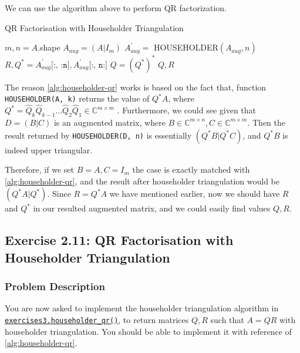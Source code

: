 \noindent We can use the algorithm above to perform QR factorization.
\begin{algorithm}[H]
  \caption{QR Factorisation with Householder Triangulation}
  \label{alg:householder-qr}
  \begin{algorithmic}[1]
  \State $m, n = A$.shape
  \State \(A_{aug} = (A|I_m)\)  
  \State \(A_{aug}^{'} = \) HOUSEHOLDER\((A_{aug}, n)\)  
  \State \(R, Q^{*} = A_{aug}^{'}\texttt{[:, :n]}, A_{aug}^{'}\texttt{[:, n:]}\)  
  \State \(Q = (Q^{*})^{*}\)  
    \State \Return \(Q, R\) 
  \EndProcedure
  \end{algorithmic}
\end{algorithm}
\noindent The reason \autoref{alg:householder-qr} works is based on the fact that, function \texttt{HOUSEHOLDER(A, k)} returns the value of \(Q^{*}A\), where \(Q^{*} = \hat{Q}_{k}\hat{Q}_{k - 1}\dots \hat{Q}_{2}\hat{Q}_{1} \in \mathbb{C}^{m\times m}\)  . Furthermore, we could see given that \(D = (B | C)\) is an augmented matrix, where \(B \in \mathbb{C}^{m\times n}, C \in \mathbb{C}^{m\times m}\). Then the result returned by \texttt{HOUSEHOLDER(D, n)} is essentially \((Q^{*}B | Q^{*}C)\), and \(Q^{*}B\) is indeed upper triangular.  \medskip

\noindent Therefore, if we set \(B = A, C = I_{m}\) the case is exactly matched with \autoref{alg:householder-qr}, and the result after householder triangulation would be \((Q^{*}A|Q^{*})\). Since \(R = Q^{*}A\) we have mentioned earlier, now we should have \(R\)  and \(Q^{*}\) in our resulted augmented matrix, and we could easily find values \(Q, R\).

\subsection*{Exercise 2.11: QR Factorisation with Householder Triangulation}
\subsubsection*{Problem Description}%
You are now asked to implement the householder triangulation algorithm in \href{https://comp-lin-alg.github.io/cla_utils.html#cla_utils.exercises3.householder_qr}{\texttt{exercises3.householder\_qr()}}, to return matrices \(Q, R\)  such that \(A = QR\) with householder triangulation. You should be able to implement it with reference of \autoref{alg:householder-qr}. \medskip

